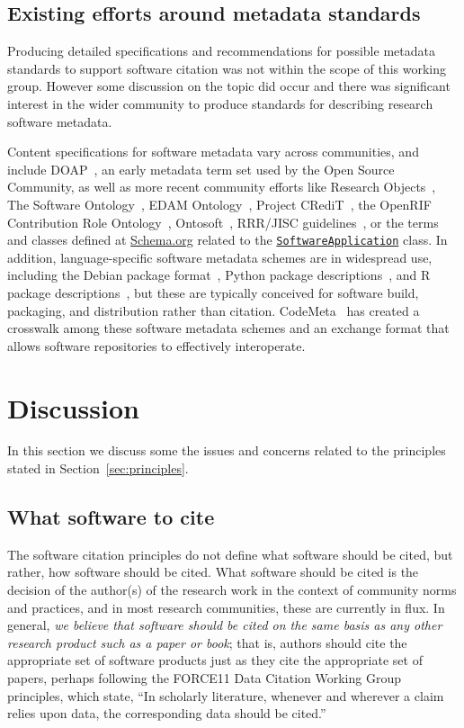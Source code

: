 \documentclass[12pt, oneside]{amsart}
\begin{document}
\subsection{Existing efforts around metadata standards}

Producing detailed specifications and recommendations for possible metadata
standards to support software citation was not within the scope of this working
group. However some discussion on the topic did occur and there was significant
interest in the wider community to produce standards for describing research
software metadata.

Content specifications for software metadata vary across communities, and
include DOAP~\cite{DOAP}, an early metadata
term set used by the Open Source Community, as well as more recent community
efforts like Research Objects~\cite{Bechhofer2013599}, The Software Ontology~\cite{Malone2014}, EDAM Ontology~\cite{Ison15052013}, Project
CRediT~\cite{casrai-credit}, the OpenRIF Contribution Role Ontology~\cite{Gutzman2016}, Ontosoft~\cite{ontosoft}, RRR\slash JISC guidelines~\cite{JISC2015},
or the terms and classes defined at \href{https://schema.org}{Schema.org} related to the
\href{https://schema.org/SoftwareApplication}{\texttt{SoftwareApplication}} class.   In addition,
language-specific software metadata schemes are in widespread use, including the Debian
package format~\cite{Debian_policy}, Python package descriptions~\cite{pypi}, and R package descriptions~\cite{wickham_r_2015}, but these are typically
conceived for software build, packaging, and distribution rather than citation.  CodeMeta~\cite{codemeta}
has created a crosswalk among these software metadata schemes and an exchange format that
allows software repositories to effectively interoperate.


\section{Discussion}
\label{sec:discussion}

In this section we discuss some the issues and concerns related to the principles stated in Section~\ref{sec:principles}.

\subsection{What software to cite}

The software citation principles do not define what software should be cited, but rather, how software should be cited.
What software should be cited is the decision of the author(s) of the research work in the context of community norms and practices, and in most research communities, these are currently in flux.
In general, \textit{we believe that software should be cited on the same basis as any other research product such as a paper or book}; that is, authors should cite the appropriate set of software products just as they cite the appropriate set of papers, perhaps following the
FORCE11 Data Citation Working Group principles, which state, ``In scholarly literature, whenever and wherever a claim relies upon data, the corresponding data should be cited.''~\cite{data-citation-principles}
\end{document}
